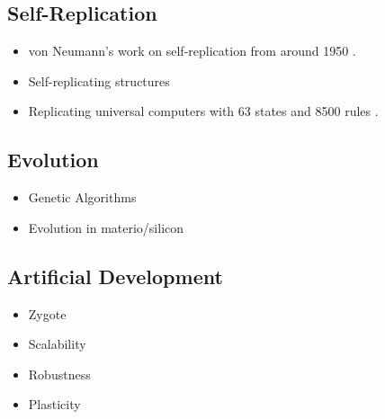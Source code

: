 \subsection{Self-Replication}

\begin{itemize}
    \item von Neumann's work on self-replication from around 1950 \cite{neumann1966selfreplication}.
    \item Self-replicating structures \cite{reggia1998neumann}
    \item Replicating universal computers with 63 states and 8500 rules \cite{perrier1996toward}.
\end{itemize}

\subsection{Evolution}

\begin{itemize}
    \item Genetic Algorithms
    \item Evolution in materio/silicon \cite{miller2014evolution}
\end{itemize}

\subsection{Artificial Development \cite{harding2008artificial}\cite{tufte2008evodevo}}

\begin{itemize}
    \item Zygote
    \item Scalability
    \item Robustness
    \item Plasticity
\end{itemize}
